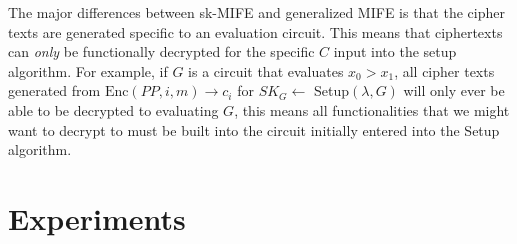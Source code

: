 \documentclass[12pt,twoside]{reedthesis}
\newcommand{\enc}[0]{\text{Enc}}
\begin{document}
   \par The major differences between sk-MIFE and generalized MIFE is that the cipher texts are generated specific to an evaluation circuit. This means that ciphertexts can \textit{only} be functionally decrypted for the specific $C$ input into the setup algorithm. For example, if $G$ is a circuit that evaluates $x_0>x_1$, all cipher texts generated from $\enc(PP,i,m) \to c_i$ for $SK_G \leftarrow$ Setup$(\lambda,G)$ will only ever be able to be decrypted to evaluating $G$, this means all functionalities that we might want to decrypt to must be built into the circuit initially entered into the Setup algorithm.

         
         
         
    \section{Experiments}
    
    
    

 

\end{document}

